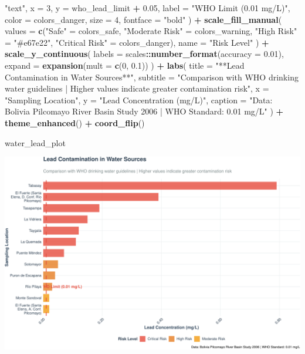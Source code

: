 \documentclass[
]{article}
\newenvironment{Shaded}{\begin{snugshade}}{\end{snugshade}}
\newcommand{\AttributeTok}[1]{\textcolor[rgb]{0.13,0.29,0.53}{#1}}
\newcommand{\DecValTok}[1]{\textcolor[rgb]{0.00,0.00,0.81}{#1}}
\newcommand{\FloatTok}[1]{\textcolor[rgb]{0.00,0.00,0.81}{#1}}
\newcommand{\FunctionTok}[1]{\textcolor[rgb]{0.13,0.29,0.53}{\textbf{#1}}}
\newcommand{\NormalTok}[1]{#1}
\newcommand{\OtherTok}[1]{\textcolor[rgb]{0.56,0.35,0.01}{#1}}
\newcommand{\SpecialCharTok}[1]{\textcolor[rgb]{0.81,0.36,0.00}{\textbf{#1}}}
\newcommand{\StringTok}[1]{\textcolor[rgb]{0.31,0.60,0.02}{#1}}
\begin{document}
\begin{Shaded}
\begin{Highlighting}[]
    \StringTok{"text"}\NormalTok{,}
    \AttributeTok{x =} \DecValTok{3}\NormalTok{, }\AttributeTok{y =}\NormalTok{ who\_lead\_limit }\SpecialCharTok{+} \FloatTok{0.05}\NormalTok{,}
    \AttributeTok{label =} \StringTok{"WHO Limit (0.01 mg/L)"}\NormalTok{,}
    \AttributeTok{color =}\NormalTok{ colors\_danger,}
    \AttributeTok{size =} \DecValTok{4}\NormalTok{,}
    \AttributeTok{fontface =} \StringTok{"bold"}
\NormalTok{  ) }\SpecialCharTok{+}
  \FunctionTok{scale\_fill\_manual}\NormalTok{(}
    \AttributeTok{values =} \FunctionTok{c}\NormalTok{(}\StringTok{"Safe"} \OtherTok{=}\NormalTok{ colors\_safe, }
               \StringTok{"Moderate Risk"} \OtherTok{=}\NormalTok{ colors\_warning, }
               \StringTok{"High Risk"} \OtherTok{=} \StringTok{"\#e67e22"}\NormalTok{, }
               \StringTok{"Critical Risk"} \OtherTok{=}\NormalTok{ colors\_danger),}
    \AttributeTok{name =} \StringTok{"Risk Level"}
\NormalTok{  ) }\SpecialCharTok{+}
  \FunctionTok{scale\_y\_continuous}\NormalTok{(}
    \AttributeTok{labels =}\NormalTok{ scales}\SpecialCharTok{::}\FunctionTok{number\_format}\NormalTok{(}\AttributeTok{accuracy =} \FloatTok{0.01}\NormalTok{),}
    \AttributeTok{expand =} \FunctionTok{expansion}\NormalTok{(}\AttributeTok{mult =} \FunctionTok{c}\NormalTok{(}\DecValTok{0}\NormalTok{, }\FloatTok{0.1}\NormalTok{))}
\NormalTok{  ) }\SpecialCharTok{+}
  \FunctionTok{labs}\NormalTok{(}
    \AttributeTok{title =} \StringTok{"**Lead Contamination in Water Sources**"}\NormalTok{,}
    \AttributeTok{subtitle =} \StringTok{"Comparison with WHO drinking water guidelines | Higher values indicate greater contamination risk"}\NormalTok{,}
    \AttributeTok{x =} \StringTok{"Sampling Location"}\NormalTok{,}
    \AttributeTok{y =} \StringTok{"Lead Concentration (mg/L)"}\NormalTok{,}
    \AttributeTok{caption =} \StringTok{"Data: Bolivia Pilcomayo River Basin Study 2006 | WHO Standard: 0.01 mg/L"}
\NormalTok{  ) }\SpecialCharTok{+}
  \FunctionTok{theme\_enhanced}\NormalTok{() }\SpecialCharTok{+}
  \FunctionTok{coord\_flip}\NormalTok{()}

\NormalTok{water\_lead\_plot}
\end{Highlighting}
\end{Shaded}

\includegraphics{WHO_standards_pdf_02_files/figure-latex/lead-water-1.pdf}
\end{document}
